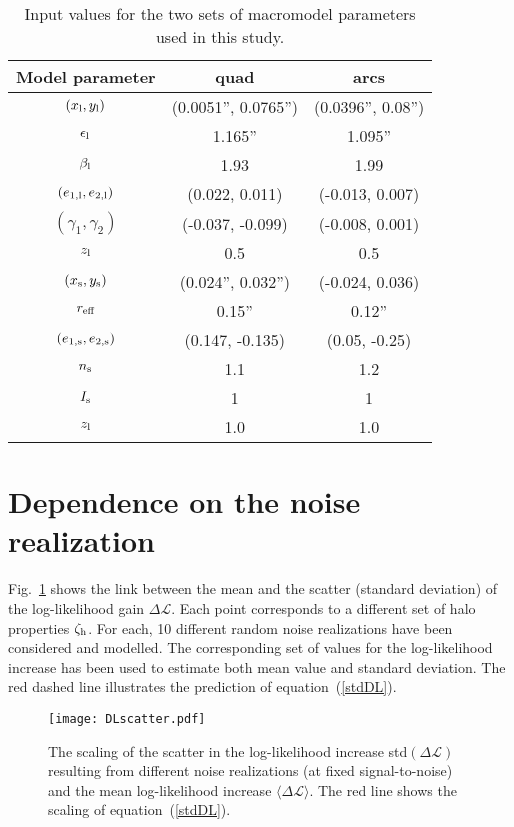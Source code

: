 \documentclass[a4paper, fleqn, usenatbib, useAMS]{mnras}
\def\zh{\zeta_{\rm h}}
\def\DL{\Delta\mathscr{L}}
\begin{document}
\begin{table}
	\centering
	\caption{Input values for the two sets of macromodel parameters used in this study.}
	\label{inputmacro}
	\begin{tabular}{ccc} %
		\hline
		 Model parameter & quad & arcs \\
		\hline
		$(x_{\rm l},y_{\rm l})$ & (0.0051'', 0.0765'') & (0.0396'', 0.08'')  \\
		 $\epsilon_{\rm l}$& 1.165'' & 1.095''  \\
		 $\beta_{\rm l}$ & 1.93 & 1.99  \\
		 $(e_{1,\rm l},e_{2,\rm l})$ & (0.022, 0.011) & (-0.013, 0.007)  \\
		 $(\gamma_1,\gamma_2)$ & (-0.037, -0.099) & (-0.008, 0.001)  \\
		 $z_{\rm l}$ & 0.5 & 0.5 \\
		 $(x_{\rm s}, y_{\rm s})$ & (0.024'', 0.032'') & (-0.024, 0.036) \\
		 $r_{\rm eff}$ & 0.15'' & 0.12'' \\
		 $(e_{1,\rm s}, e_{2,\rm s})$ & (0.147, -0.135) & (0.05, -0.25) \\
		 $n_{\rm s}$& 1.1 & 1.2  \\
		 $I_{\rm s}$& 1 & 1  \\
		 $z_{\rm l}$ & 1.0 & 1.0 \\
		\hline
	\end{tabular}
\end{table}

\section{Dependence on the noise realization}

Fig.~\ref{mean:std} shows the link between the mean and the scatter (standard deviation)
of the log-likelihood gain $\DL$. Each point corresponds to a different set of halo properties
$\zh$. For each, 10 different random noise realizations have been considered and modelled. The 
corresponding set of values for the log-likelihood increase has been used to estimate
both mean value and standard deviation. The red dashed line illustrates the prediction 
of equation~(\ref{stdDL}).

\begin{figure}
\centering
\texttt{[image: DLscatter.pdf]}
\caption{The scaling of the scatter in the log-likelihood increase std$(\DL)$ resulting from different noise
realizations (at fixed signal-to-noise) and the mean log-likelihood increase $\langle \DL \rangle$. The 
red line shows the scaling of equation~(\ref{stdDL}). }
\label{mean:std}
\end{figure}
\end{document}
